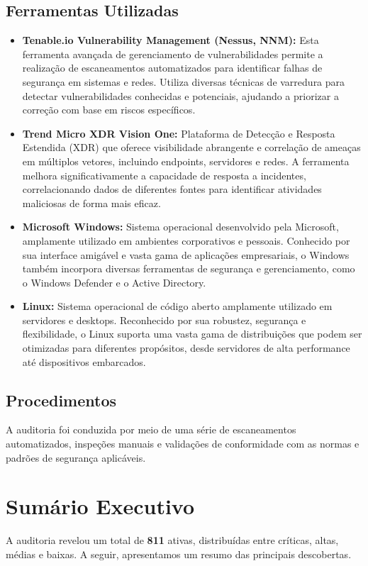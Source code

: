 \documentclass[a4paper,12pt]{article}
\begin{document}
\subsection{Ferramentas Utilizadas}
\begin{itemize}
    \item \textbf{Tenable.io Vulnerability Management (Nessus, NNM):} Esta ferramenta avançada de gerenciamento de vulnerabilidades permite a realização de escaneamentos automatizados para identificar falhas de segurança em sistemas e redes. Utiliza diversas técnicas de varredura para detectar vulnerabilidades conhecidas e potenciais, ajudando a priorizar a correção com base em riscos específicos.
    \item \textbf{Trend Micro XDR Vision One:} Plataforma de Detecção e Resposta Estendida (XDR) que oferece visibilidade abrangente e correlação de ameaças em múltiplos vetores, incluindo endpoints, servidores e redes. A ferramenta melhora significativamente a capacidade de resposta a incidentes, correlacionando dados de diferentes fontes para identificar atividades maliciosas de forma mais eficaz.
    \item \textbf{Microsoft Windows:} Sistema operacional desenvolvido pela Microsoft, amplamente utilizado em ambientes corporativos e pessoais. Conhecido por sua interface amigável e vasta gama de aplicações empresariais, o Windows também incorpora diversas ferramentas de segurança e gerenciamento, como o Windows Defender e o Active Directory.
    \item \textbf{Linux:} Sistema operacional de código aberto amplamente utilizado em servidores e desktops. Reconhecido por sua robustez, segurança e flexibilidade, o Linux suporta uma vasta gama de distribuições que podem ser otimizadas para diferentes propósitos, desde servidores de alta performance até dispositivos embarcados.
\end{itemize}

\subsection{Procedimentos}
A auditoria foi conduzida por meio de uma série de escaneamentos automatizados, inspeções manuais e validações de conformidade com as normas e padrões de segurança aplicáveis.

\section{Sumário Executivo}
A auditoria revelou um total de \textbf{811} ativas, distribuídas entre críticas, altas, médias e baixas. A seguir, apresentamos um resumo das principais descobertas.
\end{document}
